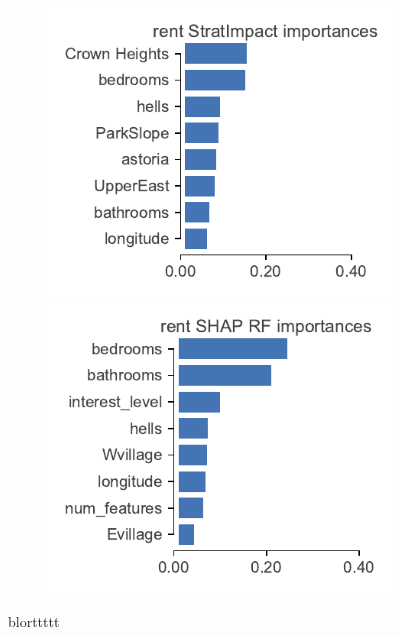 \documentclass[12pt]{article}
\begin{document}
\begin{figure}[b]
\begin{subfigure}{1\textwidth}
\vspace{-2mm}\vspace{3mm}
\end{subfigure}%
\hfill
\begin{subfigure}{1\textwidth}
    \centering
\includegraphics[scale=0.6]{images/rent-features.pdf}
\includegraphics[scale=0.6]{images/rent-features-shap-rf.pdf}
\vspace{-2mm}\vspace{3mm}
\end{subfigure}
\caption[short]{blorttttt}
\label{fig:features}
\end{figure}
\end{document}

